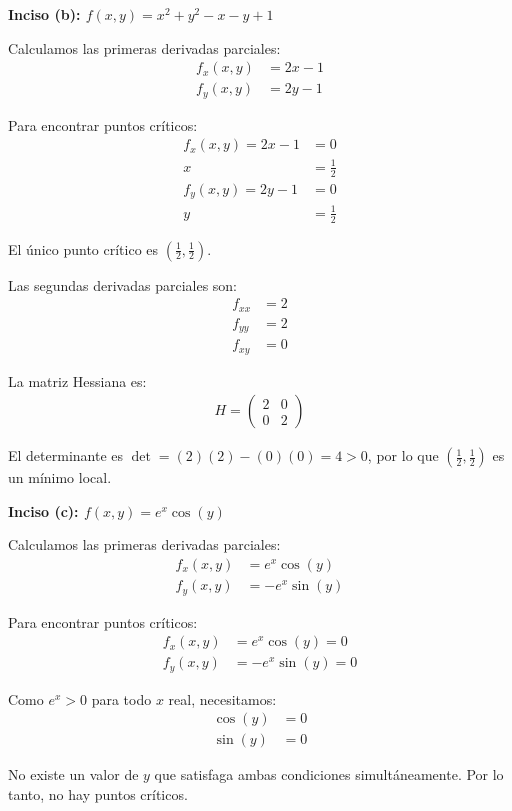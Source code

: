 \documentclass{article}
\begin{document}
\textbf{Inciso (b): $f(x,y) = x^{2} + y^{2} - x - y + 1$}

Calculamos las primeras derivadas parciales:
\begin{align}
f_x(x,y) &= 2x - 1 \\
f_y(x,y) &= 2y - 1
\end{align}

Para encontrar puntos críticos:
\begin{align}
f_x(x,y) = 2x - 1 &= 0 \\
x &= \frac{1}{2} \\
f_y(x,y) = 2y - 1 &= 0 \\
y &= \frac{1}{2}
\end{align}

El único punto crítico es $\left(\frac{1}{2}, \frac{1}{2}\right)$.

Las segundas derivadas parciales son:
\begin{align}
f_{xx} &= 2 \\
f_{yy} &= 2 \\
f_{xy} &= 0
\end{align}

La matriz Hessiana es:
\begin{align}
H = \begin{pmatrix} 2 & 0 \\ 0 & 2 \end{pmatrix}
\end{align}

El determinante es $\det = (2)(2) - (0)(0) = 4 > 0$, por lo que $\left(\frac{1}{2}, \frac{1}{2}\right)$ es un mínimo local.

\textbf{Inciso (c): $f(x,y) = e^{x}\cos(y)$}

Calculamos las primeras derivadas parciales:
\begin{align}
f_x(x,y) &= e^x \cos(y) \\
f_y(x,y) &= -e^x \sin(y)
\end{align}

Para encontrar puntos críticos:
\begin{align}
f_x(x,y) &= e^x \cos(y) = 0 \\
f_y(x,y) &= -e^x \sin(y) = 0
\end{align}

Como $e^x > 0$ para todo $x$ real, necesitamos:
\begin{align}
\cos(y) &= 0 \\
\sin(y) &= 0
\end{align}

No existe un valor de $y$ que satisfaga ambas condiciones simultáneamente. Por lo tanto, no hay puntos críticos.
\end{document}
